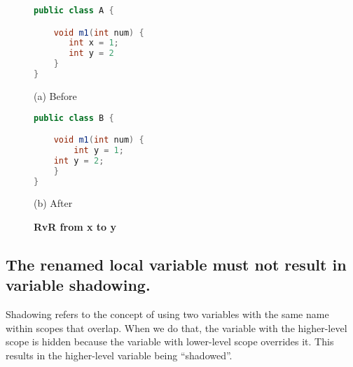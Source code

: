 \begin{figure}[th]
\centering
\begin{minipage}[t]{0.45\linewidth}
\begin{lstlisting}[language=java, basicstyle=\scriptsize\ttfamily,frame=single]
public class A {

    void m1(int num) {
       int x = 1; 
       int y = 2
    }
}
\end{lstlisting}
\centering(a) Before 
\end{minipage}
\hfill
\begin{minipage}[t]{0.45\linewidth}
\begin{lstlisting}[language=java, basicstyle=\scriptsize\ttfamily,frame=single]
public class B {

    void m1(int num) {
        int y = 1; 
	int y = 2;
    }
}
\end{lstlisting}
\centering(b) After 
\end{minipage}
\caption{\textbf{RvR from x to y}}
\label{figure:precond5_2}
\end{figure}

\subsection{The renamed local variable must not result in variable shadowing.}
Shadowing refers to the concept of using two variables with the same name within scopes that overlap. When we do that, the variable with the higher-level scope is hidden because the variable with lower-level scope overrides it. This results in the higher-level variable being ``shadowed''. 

